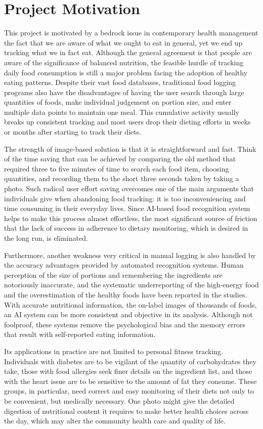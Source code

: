 \documentclass[12pt, openany]{report}
\begin{document}
       
\section{Project Motivation}
This project is motivated by a bedrock issue in contemporary health management the fact that we are aware of what we ought to eat in general, yet we end up tracking what we in fact eat. Although the general agreement is that people are aware of the significance of balanced nutrition, the feasible hurdle of tracking daily food consumption is still a major problem facing the adoption of healthy eating patterns. Despite their vast food databases, traditional food logging programs also have the disadvantages of having the user search through large quantities of foods, make individual judgement on portion size, and enter multiple data points to maintain one meal. This cumulative activity usually breaks up consistent tracking and most users drop their dieting efforts in weeks or months after starting to track their diets.

The strength of image-based solution is that it is straightforward and fast. Think of the time saving that can be achieved by comparing the old method that required three to five minutes of time to search each food item, choosing quantities, and recording them to the short three seconds taken by taking a photo. Such radical user effort saving overcomes one of the main arguments that individuals give when abandoning food tracking: it is too inconveniencing and time consuming in their everyday lives. Since AI-based food recognition system helps to make this process almost effortless, the most significant source of friction that the lack of success in adherence to dietary monitoring, which is desired in the long run, is eliminated.

Furthermore, another weakness very critical in manual logging is also handled by the accuracy advantages provided by automated recognition systems. Human perception of the size of portions and remembering the ingredients are notoriously inaccurate, and the systematic underreporting of the high-energy food and the overestimation of the healthy foods have been reported in the studies. With accurate nutritional information, the on-label images of thousands of foods, an AI system can be more consistent and objective in its analysis. Although not foolproof, these systems remove the psychological bias and the memory errors that result with self-reported eating information.

Its applications in practice are not limited to personal fitness tracking. Individuals with diabetes are to be vigilant of the quantity of carbohydrates they take, those with food allergies seek finer details on the ingredient list, and those with the heart issue are to be sensitive to the amount of fat they consume. These groups, in particular, need correct and easy monitoring of their diets not only to be convenient, but medically necessary. One photo might give the detailed digestion of nutritional content it requires to make better health choices across the day, which may alter the community health care and quality of life.
\end{document}
